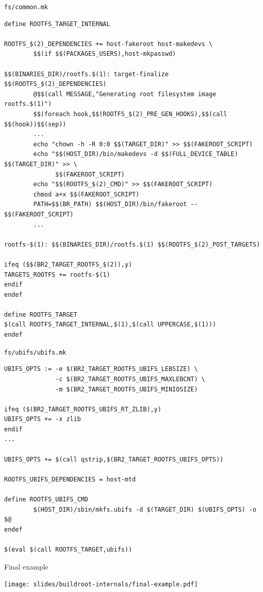 \begin{frame}[fragile]{{\tt fs/common.mk}}
  \begin{block}{}
    \begin{verbatim}
define ROOTFS_TARGET_INTERNAL

ROOTFS_$(2)_DEPENDENCIES += host-fakeroot host-makedevs \
        $$(if $$(PACKAGES_USERS),host-mkpasswd)

$$(BINARIES_DIR)/rootfs.$(1): target-finalize $$(ROOTFS_$(2)_DEPENDENCIES)
        @$$(call MESSAGE,"Generating root filesystem image rootfs.$(1)")
        $$(foreach hook,$$(ROOTFS_$(2)_PRE_GEN_HOOKS),$$(call $$(hook))$$(sep))
        ...
        echo "chown -h -R 0:0 $$(TARGET_DIR)" >> $$(FAKEROOT_SCRIPT)
        echo "$$(HOST_DIR)/bin/makedevs -d $$(FULL_DEVICE_TABLE) $$(TARGET_DIR)" >> \
              $$(FAKEROOT_SCRIPT)
        echo "$$(ROOTFS_$(2)_CMD)" >> $$(FAKEROOT_SCRIPT)
        chmod a+x $$(FAKEROOT_SCRIPT)
        PATH=$$(BR_PATH) $$(HOST_DIR)/bin/fakeroot -- $$(FAKEROOT_SCRIPT)
        ...

rootfs-$(1): $$(BINARIES_DIR)/rootfs.$(1) $$(ROOTFS_$(2)_POST_TARGETS)

ifeq ($$(BR2_TARGET_ROOTFS_$(2)),y)
TARGETS_ROOTFS += rootfs-$(1)
endif
endef

define ROOTFS_TARGET
$(call ROOTFS_TARGET_INTERNAL,$(1),$(call UPPERCASE,$(1)))
endef
    \end{verbatim}
  \end{block}
\end{frame}

\begin{frame}[fragile]{{\tt fs/ubifs/ubifs.mk}}
  \begin{block}{}
    \begin{verbatim}
UBIFS_OPTS := -e $(BR2_TARGET_ROOTFS_UBIFS_LEBSIZE) \
              -c $(BR2_TARGET_ROOTFS_UBIFS_MAXLEBCNT) \
              -m $(BR2_TARGET_ROOTFS_UBIFS_MINIOSIZE)

ifeq ($(BR2_TARGET_ROOTFS_UBIFS_RT_ZLIB),y)
UBIFS_OPTS += -x zlib
endif
...

UBIFS_OPTS += $(call qstrip,$(BR2_TARGET_ROOTFS_UBIFS_OPTS))

ROOTFS_UBIFS_DEPENDENCIES = host-mtd

define ROOTFS_UBIFS_CMD
        $(HOST_DIR)/sbin/mkfs.ubifs -d $(TARGET_DIR) $(UBIFS_OPTS) -o $@
endef

$(eval $(call ROOTFS_TARGET,ubifs))
    \end{verbatim}
  \end{block}
\end{frame}

\begin{frame}{Final example}
  \begin{center}
    \texttt{[image: slides/buildroot-internals/final-example.pdf]}
  \end{center}
\end{frame}
